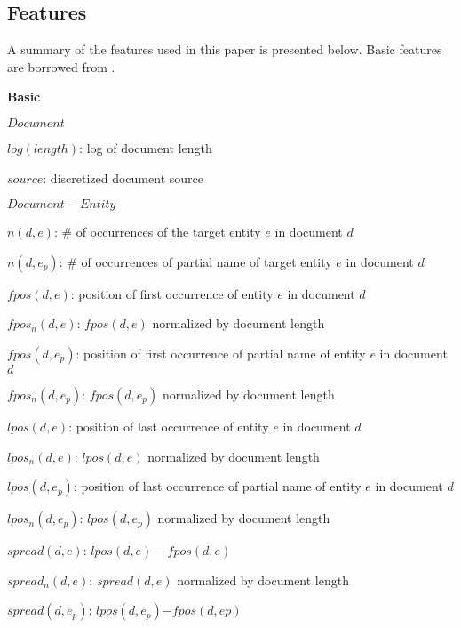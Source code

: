 \documentclass{article}
\begin{document}
\subsection{Features}
\label{feat}

A summary of the features used in this paper is presented below. Basic features are borrowed from \cite{jingang13}.

\begin{itemize*}
  \item \textbf{Basic}
    \begin{itemize*}
      \item $Document$
        \begin{itemize*}
            \item $log(length)$: log of document length
            \item $source$: discretized document source
        \end{itemize*}
      \item $Document-Entity$
        \begin{itemize*}
            \item $n(d,e)$: \# of occurrences of the target entity $e$ in document $d$
            \item $n(d,e_p)$: \# of occurrences of partial name of target entity $e$ in document $d$
            \item $fpos(d,e)$: position of first occurrence of entity $e$ in document $d$
            \item $fpos_n(d,e)$: $fpos(d,e)$ normalized by document length
            \item $fpos(d,e_p)$: position of first occurrence of partial name of entity $e$ in document $d$
            \item $fpos_n(d,e_p)$: $fpos(d,e_p)$ normalized by document length
            \item $lpos(d,e)$: position of last occurrence of entity $e$ in document $d$
            \item $lpos_n(d,e)$: $lpos(d,e)$ normalized by document length
            \item $lpos(d,e_p)$: position of last occurrence of partial name of entity $e$ in document $d$
            \item $lpos_n(d,e_p)$: $lpos(d,e_p)$ normalized by document length
            \item $spread(d,e)$: $lpos(d,e) - fpos(d,e)$
            \item $spread_n(d,e)$: $spread(d,e)$ normalized by document length
            \item $spread(d,e_p)$: $lpos(d,e_p)\mathord{-}fpos(d,ep)$

\end{itemize*}
\end{itemize*}
\end{itemize*}
\end{document}
